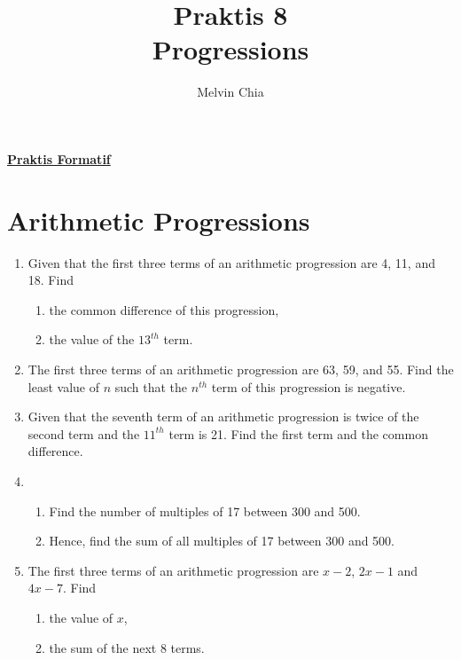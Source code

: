 \documentclass{report}
\title{Praktis 8\\Progressions}
\author{Melvin Chia}
\begin{document}
\maketitle

\begin{multicols*}{2}
    \noindent\Large{\underline{\textbf{Praktis Formatif}}}
    \normalsize
    \section{Arithmetic Progressions}

    \begin{enumerate}
        \item Given that the first three terms of an arithmetic progression are 4, 11, and
              18. Find
              \begin{enumerate}
                  \item the common difference of this progression,
                  \item the value of the $13^{th}$ term.
              \end{enumerate}

        \item The first three terms of an arithmetic progression are 63, 59, and 55. Find the
              least value of $n$ such that the $n^{th}$ term of this progression is negative.

        \item Given that the seventh term of an arithmetic progression is twice of the second
              term and the $11^{th}$ term is 21. Find the first term and the common
              difference.

        \item \begin{enumerate}
                  \item Find the number of multiples of 17 between 300 and 500.

                  \item Hence, find the sum of all multiples of 17 between 300 and 500.
              \end{enumerate}

        \item The first three terms of an arithmetic progression are $x-2$, $2x-1$ and
              $4x-7$. Find
              \begin{enumerate}
                  \item the value of $x$,
                  \item the sum of the next 8 terms.
              \end{enumerate}
    \end{enumerate}

\end{multicols*}
\end{document}
